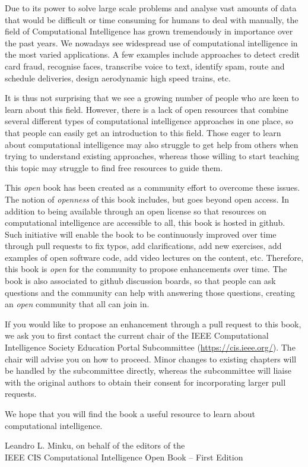 %
%

\preface

Due to its power to solve large scale problems and analyse vast amounts of data that would be difficult or time consuming for humans to deal with manually, the field of Computational Intelligence has grown tremendously in importance over the past years. We nowadays see widespread use of computational intelligence in the most varied applications. A few examples include approaches to detect credit card fraud, recognise faces, transcribe voice to text, identify spam, route and schedule deliveries, design aerodynamic high speed trains, etc. 

It is thus not surprising that we see a growing number of people who are keen to learn about this field. However, there is a lack of open resources that combine several different types of computational intelligence approaches in one place, so that people can easily get an introduction to this field. Those eager to learn about computational intelligence may also struggle to get help from others when trying to understand existing approaches, whereas those willing to start teaching this topic may struggle to find free resources to guide them. 

This \textit{open} book has been created as a community effort to overcome these issues. The notion of \textit{openness} of this book includes, but goes beyond open access. In addition to being available through an open license so that resources on computational intelligence are accessible to all, this book is hosted in github. Such initiative will enable the book to be continuously improved over time through pull requests to fix typos, add clarifications, add new exercises, add examples of open software code, add video lectures on the content, etc. Therefore, this book is \textit{open} for the community to propose enhancements over time. The book is also associated to github discussion boards, so that people can ask questions and the community can help with answering those questions, creating an \textit{open} community that all can join in. 

If you would like to propose an enhancement through a pull request to this book, we ask you to first contact the current chair of the IEEE Computational Intelligence Society Education Portal Subcommittee (\url{https://cis.ieee.org/}). The chair will advise you on how to proceed. Minor changes to existing chapters will be handled by the subcommittee directly, whereas the subcommittee will liaise with the original authors to obtain their consent for incorporating larger pull requests. 

We hope that you will find the book a useful resource to learn about computational intelligence.

\vspace{\baselineskip}
\begin{flushright}\noindent
Leandro L. Minku, on behalf of the editors of the\\
IEEE CIS Computational Intelligence Open Book -- First Edition 
\end{flushright}


